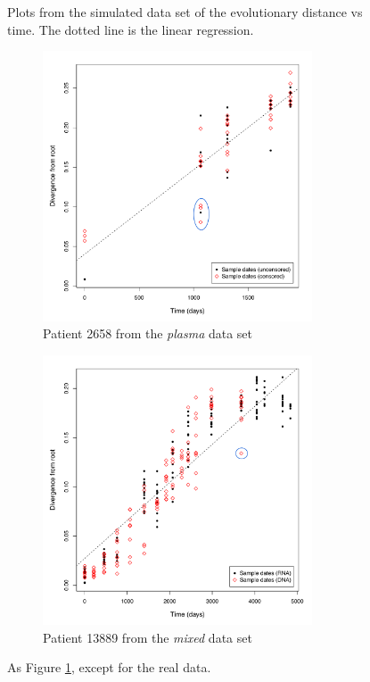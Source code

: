 \documentclass[12pt]{article}
\begin{document}
\begin{figure}[ht]

	\caption[Simulated Data]{Plots from the simulated data set of the evolutionary distance vs time. The dotted line is the linear regression.}
	\label{fig:results1}
\end{figure}

\begin{figure}[ht]
	\centering
	\begin{subfigure}[ht]{8cm}
		\includegraphics[width=8cm]{figures/ancre.pdf}
		\caption{Patient 2658 from the \emph{plasma} data set}
		\label{fig:resultsancre}
	\end{subfigure}
	\begin{subfigure}[ht]{8cm}
		\includegraphics[width=8cm]{figures/lanl.pdf}
		\caption{Patient 13889 from the \emph{mixed} data set}
		\label{fig:resultslanl}
	\end{subfigure}
	\caption[Examples]{As Figure \ref{fig:results1}, except for the real data.}
	\label{fig:results2}
\end{figure}
\end{document}
